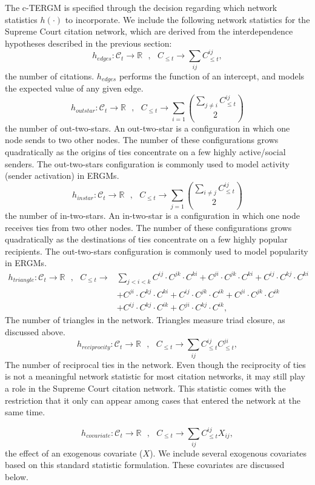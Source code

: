 \documentclass[headsepline=true, abstracton]{scrartcl}
\begin{document}
The c-TERGM is specified through 
the decision regarding which network statistics $h(\cdot)$ to incorporate. We include the following network statistics for the Supreme Court citation network, which are derived from the interdependence hypotheses described in the previous section:
$$h_{edges}:\mathcal{C}_t \to \mathbb{R}~~~, ~~~C_{\leq t} \to \sum_{ij} C_{\leq t}^{ij}, $$
the number of citations.  $h_{edges}$ performs the function of an intercept, and models the expected value of any given edge.
$$h_{outstar}:\mathcal{C}_t \to \mathbb{R}~~~, ~~~C_{\leq t} \to \sum_{i=1} {\sum_{j \neq i} C_{\leq t}^{ij} \choose 2} $$
the number of out-two-stars. An out-two-star is a configuration in which one node sends to two other nodes. The number of these configurations grows quadratically as the origins of ties concentrate on a few highly active/social senders. The out-two-stars configuration is commonly used to model activity (sender activation) in ERGMs.
$$h_{instar}:\mathcal{C}_t \to \mathbb{R}~~~, ~~~C_{\leq t} \to \sum_{j=1} {\sum_{i \neq j} C_{\leq t}^{ij} \choose 2} $$
the number of in-two-stars. An in-two-star is a configuration in which one node receives ties from two other nodes. The number of these configurations grows quadratically as the destinations of ties concentrate on a few highly popular recipients. The out-two-stars configuration is commonly used to model popularity in ERGMs. 
\begin{align*}
h_{triangle}:\mathcal{C}_t \to \mathbb{R}~~~, ~~~C_{\leq t} \to & \sum_{j<i<k} C^{ij}\cdot C^{jk} \cdot C^{ki} + C^{ji}\cdot C^{jk} \cdot C^{ki} + C^{ij}\cdot C^{kj} \cdot C^{ki} \\ & + C^{ji}\cdot C^{kj} \cdot C^{ki} + C^{ij}\cdot C^{jk} \cdot C^{ik} + C^{ji}\cdot C^{jk} \cdot C^{ik}  \\ & + C^{ij}\cdot C^{kj} \cdot C^{ik} + C^{ji}\cdot C^{kj} \cdot C^{ik},  
\end{align*}
The number of triangles in the network. Triangles measure triad closure, as discussed above.      
$$h_{reciprocity}:\mathcal{C}_t \to \mathbb{R}~~~, ~~~C_{\leq t} \to \sum_{ij} C_{\leq t}^{ij}C_{\leq t}^{ji}, $$
The number of reciprocal ties in the network. Even though the reciprocity of ties is not a meaningful network statistic for most citation networks, it may still play a role in the Supreme Court citation network. This statistic comes with the restriction that it only can appear among cases that entered the network at the same time. 

$$h_{covariate}:\mathcal{C}_t \to \mathbb{R}~~~, ~~~C_{\leq t} \to \sum_{ij} C_{\leq t}^{ij}X_{ij}, $$ the effect of an exogenous covariate ($X$). We include several exogenous covariates based on this standard statistic formulation. These covariates are discussed below.
\end{document}
